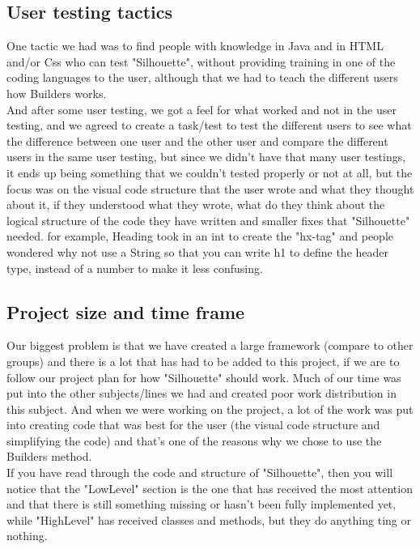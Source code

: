 \documentclass[12pt]{article}
\begin{document}
    \subsection{User testing tactics}
    One tactic we had was to find people with knowledge in Java and in HTML and/or Css who can test "Silhouette", without providing training in one of the coding languages to the user, although that we had to teach the different users how Builders works. \\
    And after some user testing, we got a feel for what worked and not in the user testing, and we agreed to create a task/test to test the different users to see what the difference between one user and the other user and compare the different users in the same user testing, but since we didn't have that many user testings, it ends up being something that we couldn’t tested properly or not at all, but the focus was on the visual code structure that the user wrote and what they thought about it, if they understood what they wrote, what do they think about the logical structure of the code they have written and smaller fixes that "Silhouette" needed. for example, Heading took in an int to create the "hx-tag" and people wondered why not use a String so that you can write h1 to define the header type, instead of a number to make it less confusing.

    \subsection{Project size and time frame}
    Our biggest problem is that we have created a large framework (compare to other groups) and there is a lot that has had to be added to this project, if we are to follow our project plan for how "Silhouette" should work. Much of our time was put into the other subjects/lines we had and created poor work distribution in this subject. And when we were working on the project, a lot of the work was put into creating code that was best for the user (the visual code structure and simplifying the code) and that's one of the reasons why we chose to use the Builders method.\\
    If you have read through the code and structure of "Silhouette", then you will notice that the "LowLevel" section is the one that has received the most attention and that there is still something missing or hasn’t been fully implemented yet, while "HighLevel" has received classes and methods, but they do anything ting or nothing.
\end{document}
